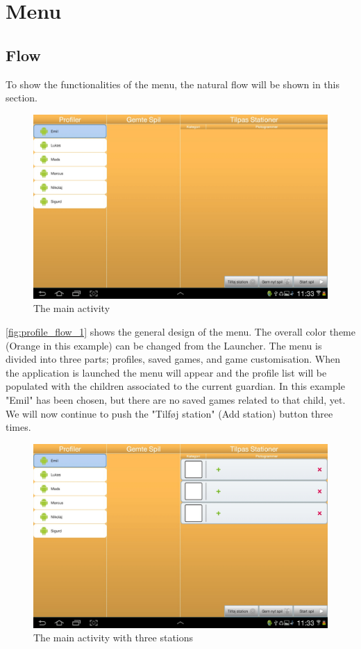 \section{Menu}

\subsection{Flow}
To show the functionalities of the menu, the natural flow will be shown in this section.
\begin{figure}[H]
\centering
\includegraphics[width=0.9\linewidth]{img/screenshots/profile_flow_1.jpg}%
\caption{The main activity}
\label{fig:profile_flow_1}
\end{figure}
\autoref{fig:profile_flow_1} shows the general design of the menu. The overall color theme (Orange in this example) can be changed from the Launcher. The menu is divided into three parts; profiles, saved games, and game customisation. When the application is launched the menu will appear and the profile list will be populated with the children associated to the current guardian. In this example "Emil" has been chosen, but there are no saved games related to that child, yet.
We will now continue to push the "Tilføj station" (Add station) button three times.

\begin{figure}[H]
\centering
\includegraphics[width=0.9\linewidth]{img/screenshots/profile_flow_2.jpg}%
\caption{The main activity with three stations}
\label{fig:profile_flow_2}
\end{figure}

